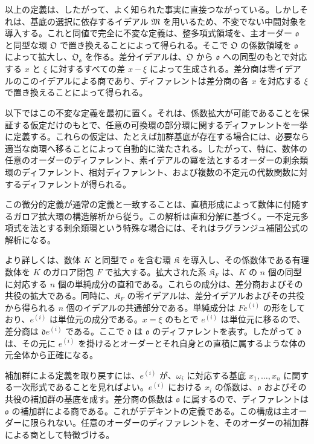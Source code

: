 \documentclass[11pt]{article}
\begin{document}
以上の定義は、したがって、よく知られた事実に直接つながっている。しかしそれは、基底の選択に依存するイデアル \(\mathfrak M\) を用いるため、不変でない中間対象を導入する。これと同値で完全に不変な定義は、整多項式領域を、主オーダー \(\mathfrak o\) と同型な環 \(\mathfrak O\) で置き換えることによって得られる。そこで \(\mathfrak O\) の係数領域を \(\mathfrak o\) によって拡大し、\(\mathfrak O_{\mathfrak o}\) を作る。差分イデアルは、\(\mathfrak O\) から \(\mathfrak o\) への同型のもとで対応する \(x\) と \(\xi\) に対するすべての差 \(x-\xi\) によって生成される。差分商は零イデアルのこのイデアルによる商であり、ディファレントは差分商の各 \(x\) を対応する \(\xi\) で置き換えることによって得られる。

以下ではこの不変な定義を最初に置く。それは、係数拡大が可能であることを保証する仮定だけのもとで、任意の可換環の部分環に関するディファレントを一挙に定義する。これらの仮定は、たとえば加群基底が存在する場合には、必要なら適当な商環へ移ることによって自動的に満たされる。したがって、特に、数体の任意のオーダーのディファレント、素イデアルの冪を法とするオーダーの剰余類環のディファレント、相対ディファレント、および複数の不定元の代数関数に対するディファレントが得られる。

この微分的定義が通常の定義と一致することは、直積形成によって数体に付随するガロア拡大環の構造解析から従う。この解析は直和分解に基づく。一不定元多項式を法とする剰余類環という特殊な場合には、それはラグランジュ補間公式の解析になる。

より詳しくは、数体 \(K\) と同型で \(\mathfrak o\) を含む環 \(\mathfrak K\) を導入し、その係数体である有理数体を \(K\) のガロア閉包 \(F\) で拡大する。拡大された系 \(\mathfrak K_F\) は、\(K\) の \(n\) 個の同型に対応する \(n\) 個の単純成分の直和である。これらの成分は、差分商およびその共役の拡大である。同時に、\(\mathfrak K_F\) の零イデアルは、差分イデアルおよびその共役から得られる \(n\) 個のイデアルの共通部分である。単純成分は \(Fe^{(i)}\) の形をしており、\(e^{(i)}\) は単位元の成分である。\(x=\xi\) のもとで \(e^{(i)}\) は単位元に移るので、差分商は \(\mathfrak d e^{(i)}\) である。ここで \(\mathfrak d\) は \(\mathfrak o\) のディファレントを表す。したがって \(\mathfrak d\) は、その元に \(e^{(i)}\) を掛けるとオーダーとそれ自身との直積に属するような体の元全体から正確になる。

補加群による定義を取り戻すには、\(e^{(i)}\) が、\(\omega_i\) に対応する基底 \(x_1,\ldots,x_n\) に関する一次形式であることを見ればよい。\(e^{(i)}\) における \(x_i\) の係数は、\(\mathfrak o\) およびその共役の補加群の基底を成す。差分商の係数は \(\mathfrak o\) に属するので、ディファレントは \(\mathfrak o\) の補加群による商である。これがデデキントの定義である。この構成は主オーダーに限られない。任意のオーダーのディファレントを、そのオーダーの補加群による商として特徴づける。
\end{document}
